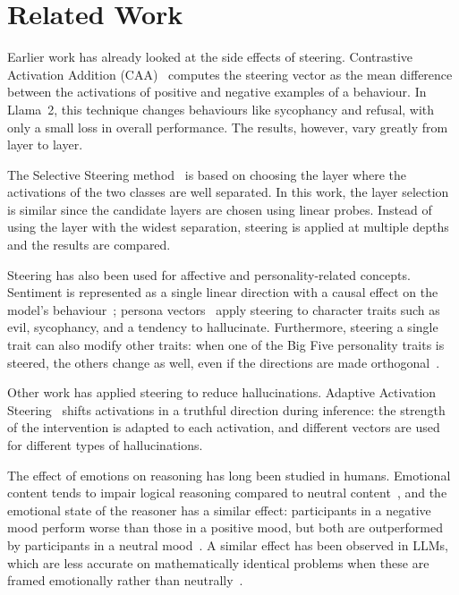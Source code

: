 \documentclass{article}
\begin{document}
\section{Related Work}
Earlier work has already looked at the side effects of steering. Contrastive Activation Addition (CAA)~\cite{panickssery2024steerllama2} computes the steering vector as the mean difference between the activations of positive and negative examples of a behaviour. In Llama~2, this technique changes behaviours like sycophancy and refusal, with only a small loss in overall performance. The results, however, vary greatly from layer to layer.

The Selective Steering method~\cite{dang2026selectivesteer} is based on choosing the layer where the activations of the two classes are well separated. In this work, the layer selection is similar since the candidate layers are chosen using linear probes. Instead of using the layer with the widest separation, steering is applied at multiple depths and the results are compared.

Steering has also been used for affective and personality-related concepts. Sentiment is represented as a single linear direction with a causal effect on the model's behaviour~\cite{tigges2023linearrep}; persona vectors~\cite{chen2025personavectors} apply steering to character traits such as evil, sycophancy, and a tendency to hallucinate. Furthermore, steering a single trait can also modify other traits: when one of the Big Five personality traits is steered, the others change as well, even if the directions are made orthogonal~\cite{bhandari-etal-2026-personality}.

Other work has applied steering to reduce hallucinations. Adaptive Activation Steering~\cite{wang2024act} shifts activations in a truthful direction during inference: the strength of the intervention is adapted to each activation, and different vectors are used for different types of hallucinations.

The effect of emotions on reasoning has long been studied in humans. Emotional content tends to impair logical reasoning compared to neutral content~\cite{blanchette2004reasoning}, and the emotional state of the reasoner has a similar effect: participants in a negative mood perform worse than those in a positive mood, but both are outperformed by participants in a neutral mood~\cite{jung2014emotions}. A similar effect has been observed in LLMs, which are less accurate on mathematically identical problems when these are framed emotionally rather than neutrally~\cite{dokme2026temper}.
\end{document}
